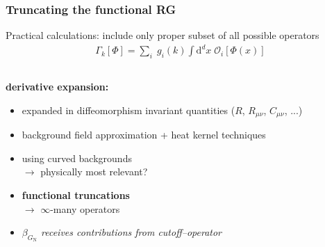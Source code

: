 \documentclass[]{beamer}  %
\newcommand\GNewton{ G_{\scriptscriptstyle{\mathrm{N}}}{} }
\begin{document}
\addtocounter{framenumber}{-1}
\begin{frame}
  \frametitle{Truncating the functional RG}

  Practical calculations: include only proper subset of all possible operators
  \begin{align*}
    \boxed{
      \Gamma_k[\Phi] = \sum_i \; g_i(k) \! \int \mathrm d^d x \; \mathcal O_i [\Phi(x)]
    }
  \end{align*}

  \vspace{-15pt}
  \begin{columns}[T]

    \begin{column}{.5\textwidth}
      \begin{center}
        \textbf{derivative expansion:}
        \begin{itemize}
          \item
            expanded in diffeomorphism invariant quantities
            ($R$, $R_{\mu\nu}$, $C_{\mu\nu}$, ...)\\[8pt]
          \item
            background field approximation
            + heat kernel techniques\\[8pt]
          \item
            using curved backgrounds\\
            $\rightarrow$ physically most relevant?\\[8pt]
          \item
            \textbf{functional truncations}\\
            $\rightarrow$ $\infty$-many operators\\[8pt]
          \item
            \textit{
              $\beta_{\GNewton}$ receives contributions
              from cutoff--operator
            }\\[8pt]
        \end{itemize}
      \end{center}
    \end{column}


\end{columns}
\end{frame}
\end{document}
